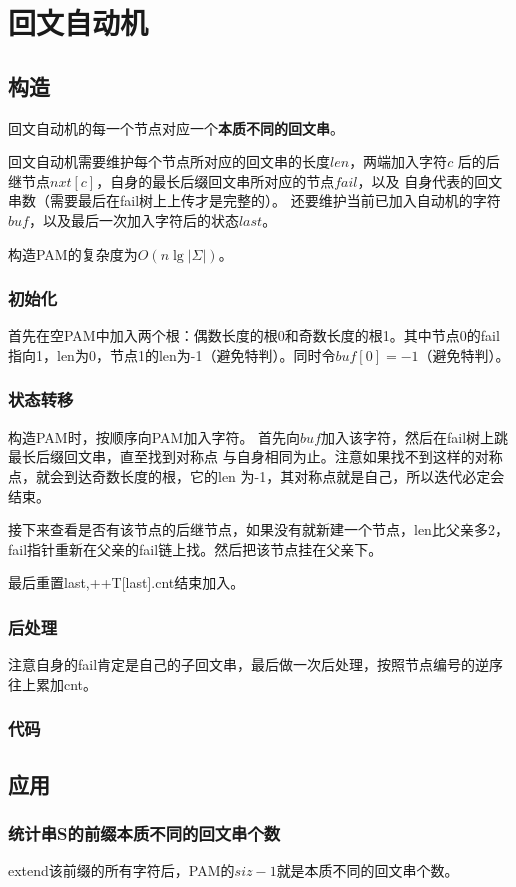 \section{回文自动机}
\subsection{构造}
回文自动机的每一个节点对应一个{\bfseries 本质不同的回文串}。

回文自动机需要维护每个节点所对应的回文串的长度$len$，两端加入字符$c$
后的后继节点$nxt[c]$，自身的最长后缀回文串所对应的节点$fail$，以及
自身代表的回文串数（需要最后在fail树上上传才是完整的）。
还要维护当前已加入自动机的字符$buf$，以及最后一次加入字符后的状态$last$。

构造PAM的复杂度为$O(n\lg |\Sigma|)$。
\subsubsection{初始化}
首先在空PAM中加入两个根：偶数长度的根0和奇数长度的根1。其中节点0的fail
指向1，len为0，节点1的len为-1（避免特判）。同时令$buf[0]=-1$（避免特判）。
\subsubsection{状态转移}
构造PAM时，按顺序向PAM加入字符。
首先向$buf$加入该字符，然后在fail树上跳最长后缀回文串，直至找到对称点
与自身相同为止。注意如果找不到这样的对称点，就会到达奇数长度的根，它的len
为-1，其对称点就是自己，所以迭代必定会结束。

接下来查看是否有该节点的后继节点，如果没有就新建一个节点，len比父亲多2，
fail指针重新在父亲的fail链上找。然后把该节点挂在父亲下。

最后重置last,++T[last].cnt结束加入。
\subsubsection{后处理}
注意自身的fail肯定是自己的子回文串，最后做一次后处理，按照节点编号的逆序
往上累加cnt。
\subsubsection{代码}

\subsection{应用}
\subsubsection{统计串S的前缀本质不同的回文串个数}
extend该前缀的所有字符后，PAM的$siz-1$就是本质不同的回文串个数。
